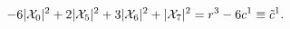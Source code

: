 \begin{equation}
\label{eq:SLAG6}
-6|{\cal X}_0|^2+2|{\cal X}_5|^2+3|{\cal X}_6|^2+|{\cal X}_7|^2=r^3-6c^1
\equiv\tilde{c}^1.
\end{equation}

